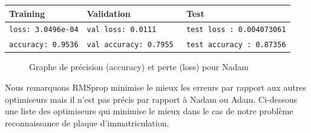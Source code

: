 		\begin{table}[H]
			\centering
			\begin{tabular}{l|l|l}
				\hline
				\textbf{Training} & \textbf{Validation} & \textbf{Test} \\
				\hline
				\texttt{loss: 3.0496e-04} & \texttt{val loss: 0.0111} & \texttt{test loss : 0.004073061} \\
				\texttt{accuracy: 0.9536} & \texttt{val accuracy: 0.7955 }& \texttt{test accuracy : 0.87356}\\
				
				\hline 
				
			\end{tabular}
		\end{table}
	
		\begin{figure}[H]
			\myfloatalign
			 \quad
			
			\caption[]{Graphe de précision (accuracy) et perte (loss)  pour Nadam}
		\end{figure}
	
	
	
	Nous remarquons RMSprop minimise le mieux les erreurs par rapport aux autres optimiseurs mais il n’est pas précis par rapport à Nadam ou Adam. Ci-dessous une liste des optimiseurs qui minimise le mieux dans le cas de notre problème reconnaissance de plaque d’immatriculation.
	
